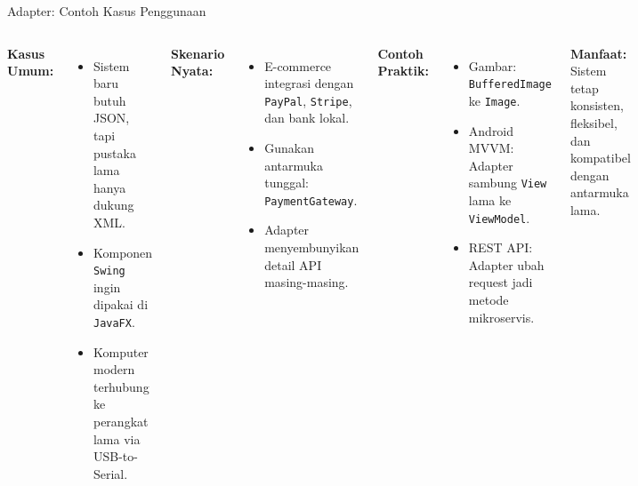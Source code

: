 \documentclass[aspectratio=169, table]{beamer}
\begin{document}
\begin{frame}[fragile]{Adapter: Contoh Kasus Penggunaan}
	\vspace{20pt}
	\begin{columns}[T]
		\textbf{Kasus Umum:}
		\begin{itemize}
			\item Sistem baru butuh JSON, tapi pustaka lama hanya dukung XML.
			\item Komponen \texttt{Swing} ingin dipakai di \texttt{JavaFX}.
			\item Komputer modern terhubung ke perangkat lama via USB-to-Serial.
		\end{itemize}
		
		\textbf{Skenario Nyata:}
		\begin{itemize}
			\item E-commerce integrasi dengan \texttt{PayPal}, \texttt{Stripe}, dan bank lokal.
			\item Gunakan antarmuka tunggal: \texttt{PaymentGateway}.
			\item Adapter menyembunyikan detail API masing-masing.
		\end{itemize}
		
		\textbf{Contoh Praktik:}
		\begin{itemize}
			\item Gambar: \texttt{BufferedImage} ke \texttt{Image}.
			\item Android MVVM: Adapter sambung \texttt{View} lama ke \texttt{ViewModel}.
			\item REST API: Adapter ubah request jadi metode mikroservis.
		\end{itemize}
		
		\vspace{8pt}
		\textbf{Manfaat:} Sistem tetap konsisten, fleksibel, dan kompatibel dengan antarmuka lama.
	\end{columns}
\end{frame}
\end{document}
